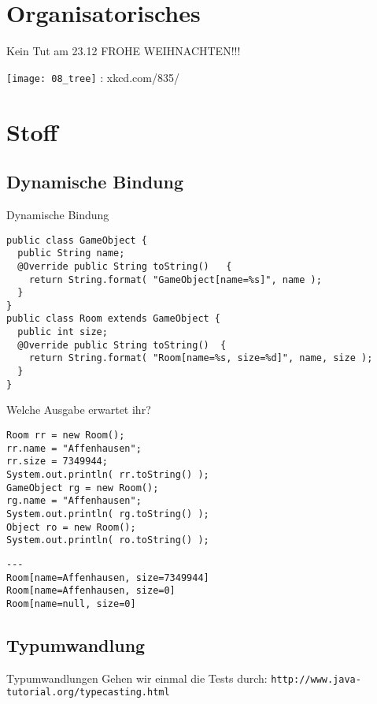 \documentclass[18pt]{beamer}
\begin{document}
\section{Organisatorisches}
\begin{frame}{Kein Tut am 23.12}
 \large FROHE WEIHNACHTEN!!!
 
 \texttt{[image: 08\_tree]}
 \tiny: xkcd.com/835/
\end{frame}


\section{Stoff}
\subsection{Dynamische Bindung}
\begin{frame}[fragile]{Dynamische Bindung}

 \begin{lstlisting}
public class GameObject {
  public String name;
  @Override public String toString()   {
    return String.format( "GameObject[name=%s]", name );
  }
}
public class Room extends GameObject {
  public int size;
  @Override public String toString()  {
    return String.format( "Room[name=%s, size=%d]", name, size );
  }
} \end{lstlisting}

\end{frame}

\begin{frame}[fragile]{Welche Ausgabe erwartet ihr?}
 \begin{lstlisting}
Room rr = new Room();
rr.name = "Affenhausen";
rr.size = 7349944;
System.out.println( rr.toString() );
GameObject rg = new Room();
rg.name = "Affenhausen";
System.out.println( rg.toString() );
Object ro = new Room();
System.out.println( ro.toString() );
 \end{lstlisting}
 \pause
 \begin{lstlisting}
---
Room[name=Affenhausen, size=7349944]
Room[name=Affenhausen, size=0]
Room[name=null, size=0]
\end{lstlisting}

\end{frame}

\subsection{Typumwandlung}
\begin{frame}[fragile]{Typumwandlungen}
 Gehen wir einmal die Tests durch:
 \verb|http://www.java-tutorial.org/typecasting.html|
\end{frame}
\end{document}

